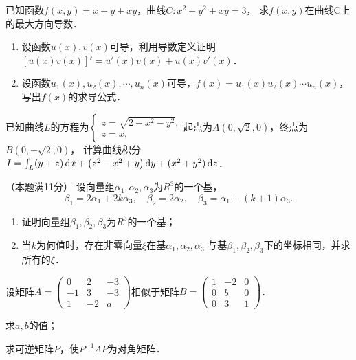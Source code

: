 \documentclass[plain,noanswer,medmath]{../../template/jnuexam}
\begin{document}
\begin{problem}[points=10]
已知函数$f(x,y) = x + y + xy$，曲线$C: x^2 + y^2 + xy = 3$，
求$f(x,y)$在曲线C上的最大方向导数．
\end{problem}


\begin{problem}[points=10]
\begin{enumerate}
\item
设函数$u(x),v(x)$可导，利用导数定义证明$[u(x)v(x)]' = u'(x)v(x) + u(x)v'(x)$．
\item
设函数$u_1(x),u_2(x), \cdots ,u_n(x)$可导，$f(x) = u_1(x) u_2(x) \cdots u_n(x)$，写出$f(x)$的求导公式．
\end{enumerate}
\end{problem}


\begin{problem}[points=10]
已知曲线$L$的方程为$\begin{cases}
  z = \sqrt{2 - x^2 - y^2} , \\
  z = x,
\end{cases}$起点为$A\left(0,\sqrt{2} ,0 \right)$，终点为$B\left(0, - \sqrt{2} ,0 \right)$，
计算曲线积分$I = \int_L (y + z)\mathop{}\!\mathrm{d} x + \left(z^2 - x^2 + y \right)\mathop{}\!\mathrm{d} y + (x^2 + y^2)\mathop{}\!\mathrm{d} z$．
\end{problem}


\begin{problem}
（本题满11分）
设向量组$\alpha_1,\alpha_2,\alpha_3$为$R^3$的一个基，
$$\beta_1 = 2\alpha_1 + 2k\alpha_3,\quad \beta_2 = 2\alpha_2,\quad
  \beta_3 = \alpha_1 + (k + 1)\alpha_3.$$
\begin{enumerate}
\item
证明向量组$\beta_1,\beta_2,\beta_3$为$R^3$的一个基；
\item
当$k$为何值时，存在非零向量$\xi$在基$\alpha_1,\alpha_2,\alpha_3$
与基$\beta_1,\beta_2,\beta_3$下的坐标相同，并求所有的$\xi$．
\end{enumerate}
\end{problem}


\begin{problem}[points=11]
设矩阵$A = \begin{pmatrix}
   0 &  2 & -3 \\
  -1 &  3 & -3 \\
   1 & -2 & a
\end{pmatrix}$相似于矩阵$B = \begin{pmatrix}
  1 & -2 & 0 \\
  0 &  b & 0 \\
  0 &  3 & 1
\end{pmatrix}$．\par
\begin{enumerate*}
\item 求$a,b$的值；
\item 求可逆矩阵$P$，使$P^{-1} AP$为对角矩阵．
\end{enumerate*}
\end{problem}
\end{document}
